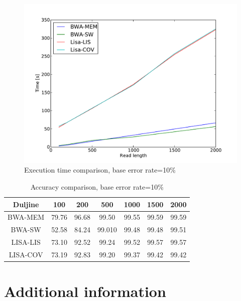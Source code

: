 \documentclass[times, utf8, diplomski]{fer}
\begin{document}
\begin{figure}[H]
\centering
\includegraphics[width=1.0\textwidth]{../img/chicken-e10-time.pdf}
\caption{Execution time comparison, base error rate=10\%}\label{chicken-e10-time}
\end{figure}

\begin{table}[H]
\centering
\begin{tabular}{|c||c|c|c|c|c|c|}
\hline
	Duljine & 100 & 200 & 500 & 1000 & 1500 & 2000\\
\hline
\hline
	BWA-MEM & 79.76 & 96.68 & 99.50 & 99.55 & 99.59 & 99.59\\
\hline
	BWA-SW  & 52.58 & 84.24 & 99.010 & 99.48 & 99.48 & 99.51\\
\hline
	LISA-LIS   & 73.10 & 92.52 & 99.24 & 99.52 & 99.57 & 99.57\\
\hline
	LISA-COV  & 73.19 & 92.83 & 99.20 & 99.37 & 99.42 & 99.42\\
\hline
\end{tabular}
\caption{Accuracy comparison, base error rate=10\%}\label{chicken-e10-correct}
\end{table}

\pagebreak

\section{Additional information}
\end{document}
